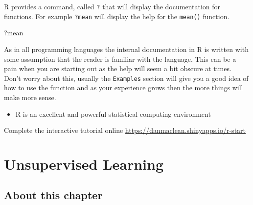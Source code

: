 \documentclass[
]{book}
\newenvironment{Shaded}{\begin{snugshade}}{\end{snugshade}}
\newcommand{\NormalTok}[1]{#1}
\providecommand{\tightlist}{%
  \setlength{\itemsep}{0pt}\setlength{\parskip}{0pt}}
\newenvironment{task}
{ \begin{tcolorbox}[title=For you to do,title filled] }
{  \end{tcolorbox} }
\newenvironment{roundup}
{ \begin{tcolorbox}[colbacktitle=yellow!50!white,
title=Round Up,coltitle=black,
fonttitle=\bfseries] }
{  \end{tcolorbox} }
\begin{document}
R provides a command, called \texttt{?} that will display the documentation for functions. For example \texttt{?mean} will display the help for the \texttt{mean()} function.

\begin{Shaded}
\begin{Highlighting}[]
\NormalTok{?mean}
\end{Highlighting}
\end{Shaded}

As in all programming languages the internal documentation in R is written with some assumption that the reader is familiar with the language. This can be a pain when you are starting out as the help will seem a bit obscure at times. Don't worry about this, usually the \texttt{Examples} section will give you a good idea of how to use the function and as your experience grows then the more things will make more sense.

\begin{roundup}
\begin{itemize}
\tightlist
\item
  R is an excellent and powerful statistical computing environment
\end{itemize}
\end{roundup}

\begin{task}
Complete the interactive tutorial online \url{https://danmaclean.shinyapps.io/r-start}
\end{task}

\hypertarget{unsupervised-learning}{%
\chapter{Unsupervised Learning}\label{unsupervised-learning}}

\hypertarget{about-this-chapter-1}{%
\section{About this chapter}\label{about-this-chapter-1}}
\end{document}
